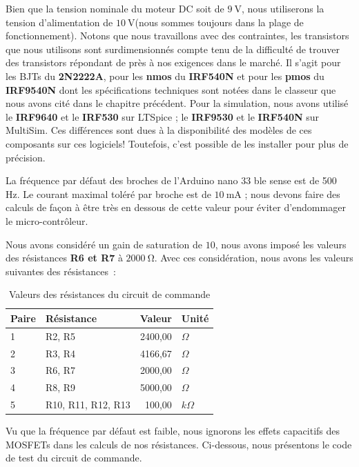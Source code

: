 \documentclass[a4paper,12pt,twoside]{report}
\theoremstyle{definition}
\theoremstyle{plain}
\theoremstyle{remark}
\begin{document}
Bien que la tension nominale du moteur \ac{DC} soit de $\SI{9}{\volt}$, nous utiliserons la tension d'alimentation de $\SI{10}{\volt}$(nous sommes toujours dans la plage de fonctionnement). Notons que nous travaillons avec des contraintes, les transistors que nous utilisons sont surdimensionnés compte tenu de la difficulté de trouver des transistors répondant de près à nos exigences dans le marché. Il s'agit pour les \acp{BJT} du \textbf{2N2222A}, pour les \textbf{nmos} du \textbf{IRF540N} et pour les \textbf{pmos} du \textbf{IRF9540N} dont les spécifications techniques sont notées dans le classeur que nous avons cité dans le chapitre précédent. Pour la simulation, nous avons utilisé le \textbf{IRF9640} et le \textbf{IRF530} sur LTSpice ; le \textbf{IRF9530} et le \textbf{IRF540N} sur MultiSim. Ces différences sont dues à la disponibilité des modèles de ces composants sur ces logiciels! Toutefois, c'est possible de les installer pour plus de précision.

La fréquence par défaut des broches de l'Arduino nano 33 ble sense est de 500 Hz. Le courant maximal toléré par broche est de $\SI{10}{\milli\ampere}$ ; nous devons faire des calculs de façon à être très en dessous de cette valeur pour éviter d'endommager le micro-contrôleur.

Nous avons considéré un gain de saturation de $10$, nous avons imposé les valeurs des  résistances \textbf{R6 et R7} à $\SI{2000}{\ohm}$. Avec ces considération, nous avons les valeurs suivantes des résistances~:

\begin{table}[h]
	\centering
	\begin{tabular}{ll r l}
		\toprule
		Paire & Résistance & Valeur & Unité \\
		\midrule
		1 & R2, R5 & 2400,00 & $\Omega$ \\
		2 & R3, R4 & 4166,67 & $\Omega$ \\
		3 & R6, R7 & 2000,00 & $\Omega$ \\
		4 & R8, R9 & 5000,00 & $\Omega$ \\
		5 & R10, R11, R12, R13 & 100,00 & $k\Omega$ \\
		\bottomrule
	\end{tabular}
	\caption{Valeurs des résistances du circuit de commande}
\end{table}

Vu que la fréquence par défaut est faible, nous ignorons les effets capacitifs des \acp{MOSFET} dans les calculs de nos résistances. Ci-dessous, nous présentons le code de test du circuit de commande.
\end{document}
